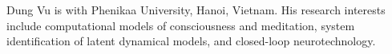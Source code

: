 \begin{IEEEbiographynophoto}{Dung Vu}
is with Phenikaa University, Hanoi, Vietnam. His research interests include computational models of consciousness and meditation, system identification of latent dynamical models, and closed-loop neurotechnology.
\end{IEEEbiographynophoto}
